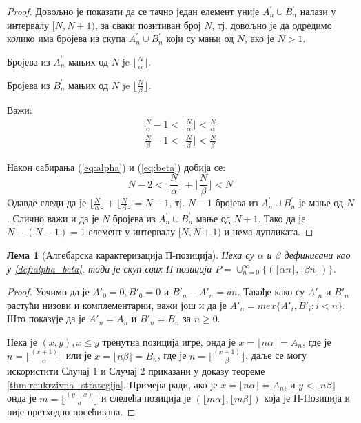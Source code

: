 \documentclass[a4paper]{article}
\newtheorem{lemma}{Лема}
\begin{document}
\begin{proof}
	Довољно је показати да се тачно један елемент уније $ A_{n}^{'} \cup B_{n}^{'} $ налази у интервалу $ [N,N+1) $, за сваки позитиван број $ N $, тј. довољно је да одредимо колико има бројева из скупа $ A_{n}^{'} \cup B_{n}^{'} $ који су мањи од $ N $, ако је $ N > 1 $.
	
	Бројева из $ A_{n}^{'} $ мањих од $ N $ je $ \lfloor \frac{N}{\alpha} \rfloor $.
	
	Бројева из $ B_{n}^{'} $ мањих од $ N $ je $ \lfloor \frac{N}{\beta} \rfloor $.
	
	Важи:
		\begin{eqnarray}
			\frac{N}{\alpha} - 1 < \lfloor \frac{N}{\alpha} \rfloor < \frac{N}{\alpha} \label{eq:alpha}\\
			\frac{N}{\beta} - 1 < \lfloor \frac{N}{\beta} \rfloor < \frac{N}{\beta}
			\label{eq:beta}
		\end{eqnarray}
	
	Након сабирања (\ref{eq:alpha}) и (\ref{eq:beta}) добија се:
		\begin{displaymath}
		N - 2 < \lfloor \frac{N}{\alpha} \rfloor + \lfloor \frac{N}{\beta} \rfloor < N
		\end{displaymath} 
	Oдавде следи да је $ \lfloor \frac{N}{\alpha} \rfloor + \lfloor \frac{N}{\beta} \rfloor = N - 1 $, тј. $ N - 1 $ бројева из $ A_{n}^{'} \cup B_{n}^{'} $ је мање од $ N $. Слично важи и да је $ N $ бројева из $ A_{n}^{'} \cup B_{n}^{'} $ мање од $ N + 1 $. Тако да је $ N - (N - 1) = 1 $ елемент у интервалу $ [N,N+1) $ и нема дупликата.
\end{proof}

\begin{lemma}[Алгебарска карактеризација П-позиција] Нека су $ \alpha $ и $ \beta $ дефинисани као у \ref{def:alpha_beta}, тада је скуп свих П-позиција $ P = \cup_{n=0}^{\infty} \{(\lfloor \alpha n \rfloor, \lfloor \beta n \rfloor)\} $.
\end{lemma}

\begin{proof}
	Уочимо да је $ A'_{0} = 0, B'_{0} = 0 $ и $ B'_{n} - A'_{n} = an $. Такође како су $ A'_{n} $ и $ B'_{n} $ растући низови и комплементарни, важи још и да је $ A'_{n} = mex \{ A'_{i}, B'_{i} : i < n \} $. Што показује да је $ A'_{n} = A_{n} $ и $ B'_{n} = B_{n}  $ за $ n \ge 0 $.
	
	Нека је $ (x, y), x \leq y $ тренутна позиција игре, онда је $ x = \lfloor n \alpha \rfloor = A_{n} $, где је $ n = \lfloor \frac{(x+1)}{\alpha} \rfloor $ или је $ x = \lfloor n \beta \rfloor = B_{n} $, где је $ n = \lfloor \frac{(x+1)}{\beta} \rfloor $, даље се могу искористити Случај 1 и Случај 2 приказани у доказу теореме \ref{thm:reukrzivna_strategija}. Примера ради, ако је $ x = \lfloor n \alpha \rfloor = A_{n} $, и $ y < \lfloor n \beta \rfloor $ онда је $ m = \lfloor
	\frac{(y-x)}{a} \rfloor $ и следећа позиција је $ (\lfloor m \alpha \rfloor, \lfloor m \beta \rfloor) $ која је П-Позиција и није претходно посећивана.
\end{proof}
\end{document}
